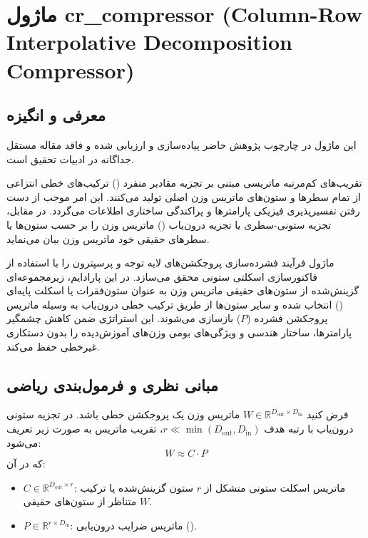 \section{ماژول cr\_compressor (Column-Row Interpolative Decomposition Compressor)}
\label{sec:module_cr_compressor}

\subsection{معرفی و انگیزه}
این ماژول در چارچوب پژوهش حاضر پیاده‌سازی و ارزیابی شده و فاقد مقاله مستقل جداگانه در ادبیات تحقیق است.

تقریب‌های کم‌مرتبه ماتریسی مبتنی بر تجزیه مقادیر منفرد () ترکیب‌های خطی انتزاعی از تمام سطرها و ستون‌های ماتریس وزن اصلی تولید می‌کنند. این امر موجب از دست رفتن تفسیرپذیری فیزیکی پارامترها و پراکندگی ساختاری اطلاعات می‌گردد. در مقابل، تجزیه ستونی-سطری یا تجزیه درون‌یاب () ماتریس وزن را بر حسب ستون‌ها یا سطرهای حقیقی خود ماتریس وزن بیان می‌نماید.

ماژول  فرآیند فشرده‌سازی پروجکشن‌های لایه توجه و پرسپترون را با استفاده از فاکتورسازی اسکلتی ستونی محقق می‌سازد. در این پارادایم، زیرمجموعه‌ای گزینش‌شده از ستون‌های حقیقی ماتریس وزن به عنوان ستون‌فقرات یا اسکلت پایه‌ای () انتخاب شده و سایر ستون‌ها از طریق ترکیب خطی درون‌یاب به وسیله ماتریس پروجکشن فشرده ($P$) بازسازی می‌شوند. این استراتژی ضمن کاهش چشمگیر پارامترها، ساختار هندسی و ویژگی‌های بومی وزن‌های آموزش‌دیده را بدون دستکاری غیرخطی حفظ می‌کند.

\subsection{مبانی نظری و فرمول‌بندی ریاضی}
فرض کنید $W \in \mathbb{R}^{D_{\text{out}} \times D_{\text{in}}}$ ماتریس وزن یک پروجکشن خطی باشد. در تجزیه ستونی درون‌یاب با رتبه هدف $r \ll \min(D_{\text{out}}, D_{\text{in}})$، تقریب ماتریس به صورت زیر تعریف می‌شود:
\begin{equation}
W \approx C \cdot P
\end{equation}
که در آن:
\begin{itemize}
    \item $C \in \mathbb{R}^{D_{\text{out}} \times r}$: ماتریس اسکلت ستونی متشکل از $r$ ستون گزینش‌شده یا ترکیب متناظر از ستون‌های حقیقی $W$.
    \item $P \in \mathbb{R}^{r \times D_{\text{in}}}$: ماتریس ضرایب درون‌یابی ().
\end{itemize}

